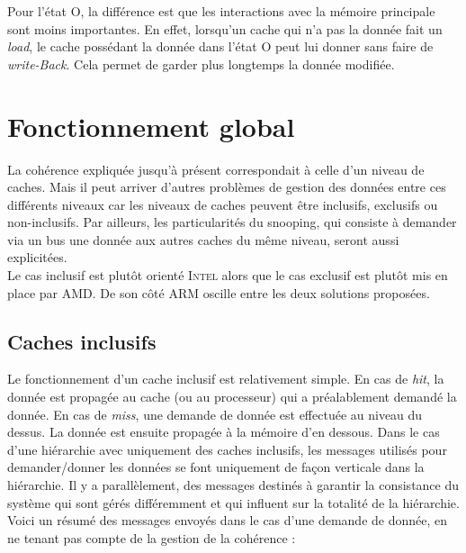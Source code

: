 Pour l'état O, la différence est que les interactions avec la mémoire principale sont moins importantes. En effet, lorsqu'un cache qui n'a pas la donnée fait un \textit{load}, le cache possédant la donnée dans l'état O peut lui donner sans faire de \textit{write-Back}. Cela permet de garder plus longtemps la donnée modifiée.

\newpage
\section{Fonctionnement global}
La cohérence expliquée jusqu'à présent correspondait à celle d'un niveau de caches. Mais il peut arriver d'autres problèmes de gestion des données entre ces différents niveaux car les niveaux de caches peuvent être inclusifs, exclusifs ou non-inclusifs. Par ailleurs, les particularités du snooping, qui consiste à demander via un bus une donnée aux autres caches du même niveau, seront aussi explicitées. \\

Le cas inclusif est plutôt orienté \textsc{Intel} alors que le cas exclusif est plutôt mis en place par \textsc{AMD}. De son côté \textsc{ARM} oscille entre les deux solutions proposées.

\label{inclusivite}
\subsection{Caches inclusifs}
Le fonctionnement d'un cache inclusif est relativement simple. En cas de \textit{hit}, la donnée est propagée au cache (ou au processeur) qui a préalablement demandé la donnée. En cas de \textit{miss}, une demande de donnée est effectuée au niveau du dessus. La donnée est ensuite propagée à la mémoire d'en dessous. Dans le cas d'une hiérarchie avec uniquement des caches inclusifs, les messages utilisés pour demander/donner les données se font uniquement de façon verticale dans la hiérarchie. Il y a parallèlement, des messages destinés à garantir la consistance du système qui sont gérés différemment et qui influent sur la totalité de la hiérarchie. Voici un résumé des messages envoyés dans le cas d'une demande de donnée, en ne tenant pas compte de la gestion de la cohérence : \\

